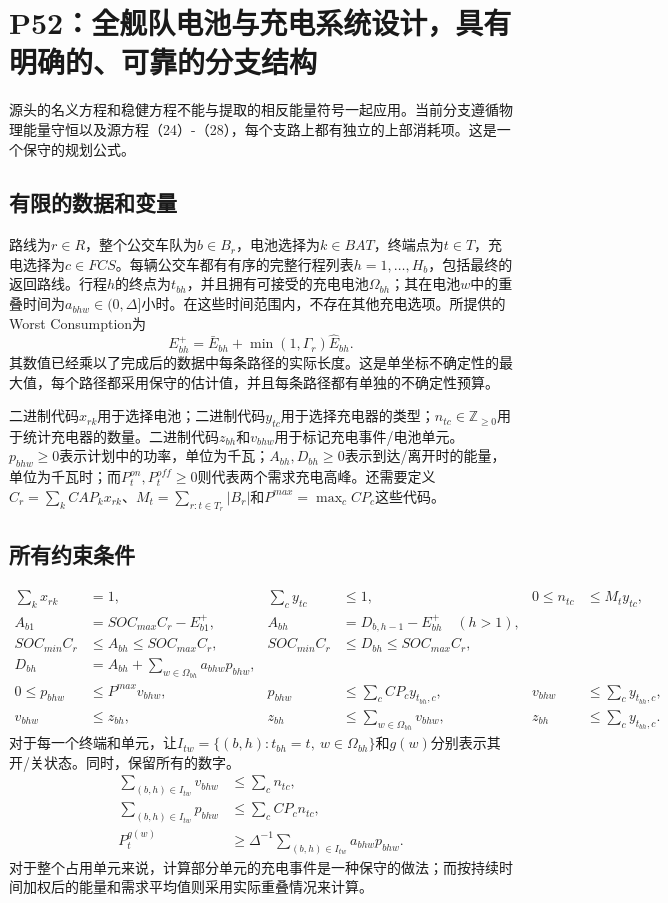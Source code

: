 \documentclass[11pt]{article}
\begin{document}
\section*{P52：全舰队电池与充电系统设计，具有明确的、可靠的分支结构}
源头的名义方程和稳健方程不能与提取的相反能量符号一起应用。当前分支遵循物理能量守恒以及源方程（24）-（28），每个支路上都有独立的上部消耗项。这是一个保守的规划公式。

\subsection*{有限的数据和变量}
路线为$r\in R$，整个公交车队为$b\in B_r$，电池选择为$k\in BAT$，终端点为$t\in T$，充电选择为$c\in FCS$。每辆公交车都有有序的完整行程列表$h=1,\ldots,H_b$，包括最终的返回路线。行程$h$的终点为$t_{bh}$，并且拥有可接受的充电电池$\Omega_{bh}$；其在电池$w$中的重叠时间为$a_{bhw}\in(0,\Delta]$小时。在这些时间范围内，不存在其他充电选项。所提供的 Worst Consumption为
\[
 E_{bh}^{+}=\bar E_{bh}+\min(1,\Gamma_r)\widehat E_{bh}.
\]
其数值已经乘以了完成后的数据中每条路径的实际长度。这是单坐标不确定性的最大值，每个路径都采用保守的估计值，并且每条路径都有单独的不确定性预算。

二进制代码$x_{rk}$用于选择电池；二进制代码$y_{tc}$用于选择充电器的类型；$n_{tc}\in\mathbb Z_{\ge0}$用于统计充电器的数量。二进制代码$z_{bh}$和$v_{bhw}$用于标记充电事件/电池单元。$p_{bhw}\ge0$表示计划中的功率，单位为千瓦；$A_{bh},D_{bh}\ge0$表示到达/离开时的能量，单位为千瓦时；而$P_t^{on},P_t^{off}\ge0$则代表两个需求充电高峰。还需要定义$C_r=\sum_k CAP_kx_{rk}$、$M_t=\sum_{r:t\in T_r}|B_r|$和$P^{max}=\max_c CP_c$这些代码。

\subsection*{所有约束条件}
\begin{align}
\sum_kx_{rk}&=1,&
\sum_c y_{tc}&\le1,&
0\le n_{tc}&\le M_t y_{tc},\\
A_{b1}&=SOC_{max}C_r-E_{b1}^{+},&
A_{bh}&=D_{b,h-1}-E_{bh}^{+}\quad(h>1),\\
SOC_{min}C_r&\le A_{bh}\le SOC_{max}C_r,&
SOC_{min}C_r&\le D_{bh}\le SOC_{max}C_r,\\
D_{bh}&=A_{bh}+\sum_{w\in\Omega_{bh}}a_{bhw}p_{bhw},\\
0\le p_{bhw}&\le P^{max}v_{bhw},&
p_{bhw}&\le\sum_cCP_c y_{t_{bh},c},&
v_{bhw}&\le\sum_cy_{t_{bh},c},\\
v_{bhw}&\le z_{bh},&
z_{bh}&\le\sum_{w\in\Omega_{bh}}v_{bhw},&
z_{bh}&\le\sum_c y_{t_{bh},c}.
\end{align}
对于每一个终端和单元，让$I_{tw}=\{(b,h):t_{bh}=t,\ w\in\Omega_{bh}\}$和$g(w)$分别表示其开/关状态。同时，保留所有的数字。
\begin{align}
\sum_{(b,h)\in I_{tw}}v_{bhw}&\le\sum_c n_{tc},\\
\sum_{(b,h)\in I_{tw}}p_{bhw}&\le\sum_c CP_cn_{tc},\\
P_t^{g(w)}&\ge\Delta^{-1}\sum_{(b,h)\in I_{tw}}a_{bhw}p_{bhw}.
\end{align}
对于整个占用单元来说，计算部分单元的充电事件是一种保守的做法；而按持续时间加权后的能量和需求平均值则采用实际重叠情况来计算。
\end{document}
